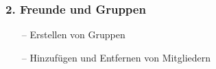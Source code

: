 \documentclass[aspectratio=1610]{beamer}
\begin{document}
\begin{frame}[plain]
\frametitle{2. Freunde und Gruppen}
\begin{minipage}{0.5\textwidth}
	\setlength{\fboxsep}{0pt}%
	\setlength{\fboxrule}{1pt}%
	\captionsetup{labelformat=empty}
	\centering
\end{minipage}%
\begin{minipage}{0.5\textwidth}
	\begin{itemize}
		\setlength\itemsep{0.3em}
		\item[--] Erstellen von Gruppen
		\item[--] Hinzufügen und Entfernen von Mitgliedern
	\end{itemize}
\end{minipage}%
\end{frame}
\end{document}
